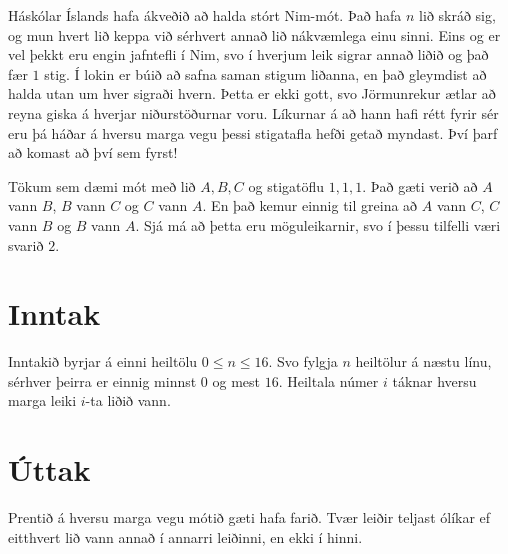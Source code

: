 
Háskólar Íslands hafa ákveðið að halda stórt Nim-mót.
Það hafa $n$ lið skráð sig, og mun hvert lið keppa við
sérhvert annað lið nákvæmlega einu sinni.
Eins og er vel þekkt eru engin jafntefli í Nim, svo
í hverjum leik sigrar annað liðið og það fær $1$ stig.
Í lokin er búið að safna saman stigum liðanna, en það
gleymdist að halda utan um hver sigraði hvern.
Þetta er ekki gott, svo Jörmunrekur ætlar að reyna giska
á hverjar niðurstöðurnar voru.
Líkurnar á að hann hafi rétt fyrir sér eru þá háðar á
hversu marga vegu þessi stigatafla hefði getað myndast.
Því þarf að komast að því sem fyrst!

Tökum sem dæmi mót með lið $A, B, C$ og stigatöflu $1, 1, 1$.
Það gæti verið að $A$ vann $B$, $B$ vann $C$ og $C$ vann $A$.
En það kemur einnig til greina að $A$ vann $C$, $C$ vann $B$
og $B$ vann $A$.
Sjá má að þetta eru möguleikarnir, svo í þessu tilfelli
væri svarið $2$.

\section*{Inntak}

Inntakið byrjar á einni heiltölu $0 \leq n \leq 16$.
Svo fylgja $n$ heiltölur á næstu línu, sérhver þeirra
er einnig minnst $0$ og mest $16$.
Heiltala númer $i$ táknar hversu marga leiki
$i$-ta liðið vann.

\section*{Úttak}

Prentið á hversu marga vegu mótið gæti hafa farið.
Tvær leiðir teljast ólíkar ef eitthvert lið vann annað
í annarri leiðinni, en ekki í hinni.
